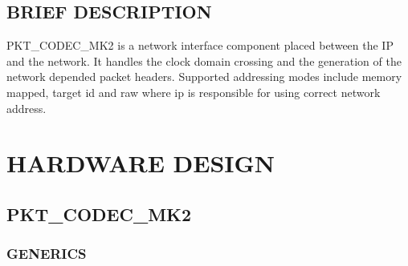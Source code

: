 \documentclass[a4paper,10pt,oneside,final]{article}
\begin{document}
\subsection{BRIEF DESCRIPTION}

PKT\_CODEC\_MK2 is a network interface component placed between the IP
and the network. It handles the clock domain crossing and the
generation of the network depended packet headers. Supported
addressing modes include memory mapped, target id and raw where ip is
responsible for using correct network address.







\newpage
\section{HARDWARE DESIGN}

\subsection{PKT\_CODEC\_MK2}

\subsubsection{GENERICS}
\end{document}
